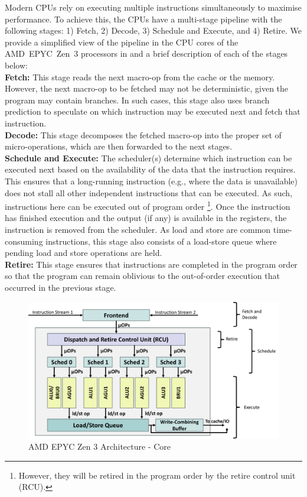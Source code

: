 Modern CPUs rely on executing multiple instructions simultaneously to maximise performance.
To achieve this, the CPUs have a multi-stage pipeline with the following stages: 1) Fetch, 2) Decode, 3) Schedule and Execute, and 4) Retire.
We provide a simplified view of the pipeline in the CPU cores of the AMD~EPYC~Zen~3 processors in  and a brief description of each of the stages below:\\
\textbf{Fetch: } This stage reads the next macro-op from the cache or the memory. 
However, the next macro-op to be fetched may not be deterministic, given the program may contain branches. 
In such cases, this stage also uses branch prediction to speculate on which instruction may be executed next and fetch that instruction.\\
\textbf{Decode: } This stage decomposes the fetched macro-op into the proper set of micro-operations, which are then forwarded to the next stages.\\
\textbf{Schedule and Execute: } The scheduler(s) determine which instruction can be executed next based on the availability of the data that the instruction requires. 
This ensures that a long-running instruction (e.g., where the data is unavailable) does not stall all other independent instructions that can be executed.
As such, instructions here can be executed out of program order
\footnote{However, they will be retired in the program order by the retire control unit (RCU).}. 
Once the instruction has finished execution and the output (if any) is available in the registers, the instruction is removed from the scheduler.
As load and store are common time-consuming instructions, this stage also consists of a load-store queue where pending load and store operations are held. \\
\textbf{Retire: } This stage ensures that instructions are completed in the program order so that the program can remain oblivious to the out-of-order execution that occurred in the previous stage.

\begin{figure}[!htb]
    \centering
    \includegraphics[width=1.1\columnwidth]{figures/interconnect-sc/amd_arch/core.png}
    \caption{AMD EPYC Zen 3 Architecture - Core}
    \label{fig:amd-core}
\end{figure}

